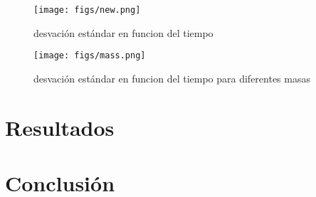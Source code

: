 \documentclass[12pts, letterpaper, twocolumn]{article}
\begin{document}
\begin{figure*}[h]
    \centering
    \texttt{[image: figs/new.png]}
    \caption{desvación estándar en funcion del tiempo}
    \label{fig:sigma}
\end{figure*}

\begin{figure*}[h]
    \centering
    \texttt{[image: figs/mass.png]}
    \caption{desvación estándar en funcion del tiempo para diferentes masas}
    \label{fig:mass}
\end{figure*}


\section{Resultados}
\section{Conclusión}
\nocite{*}
\printbibliography
\end{document}
